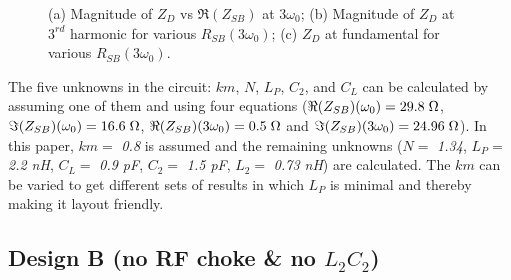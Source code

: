 \documentclass[conference]{IEEEtran}
\begin{document}
\begin{figure}[!t]
\begin{subfigure}{0.4\textwidth}
\caption{}
\label{fig:Design_A_Rn_var_1H}
\end{subfigure}
\caption{(a) Magnitude of $Z_{D}$ vs $\Re(Z_{SB})$ at $3\omega_0$; (b) Magnitude of $Z_D$ at $3^{rd}$ harmonic for various $R_{SB}(3\omega_0)$; (c) $Z_D$ at fundamental for various $R_{SB}(3\omega_0)$.}
\label{fig:Design_A_Rn_var}
\vspace{-0.2in}
\end{figure}

The five unknowns in the circuit: $km$, $N$, $L_P$, $C_2$, and $C_L$ can be calculated by assuming one of them and using four equations ($\Re(Z_{SB})(\omega_0) =  29.8\hspace{1mm} \Omega$, $\Im(Z_{SB})(\omega_0) = 16.6\hspace{1mm}\Omega$, $\Re(Z_{SB})(3\omega_0) = 0.5\hspace{1mm}\Omega$ and  $\Im(Z_{SB})(3\omega_0) = 24.96\hspace{1mm}\Omega$). In this paper, $km =$ \textit{0.8} is assumed and the remaining unknowns ($N =$ \textit{1.34}, $L_P =$ \textit{2.2 nH}, $C_L =$ \textit{0.9 pF}, $C_2 =$ \textit{1.5 pF}, $L_2 =$ \textit{0.73 nH}) are calculated. The $km$ can be varied to get different sets of results in which $L_P$ is minimal and thereby making it layout friendly.


\subsection{Design B (no RF choke \& no $L_2C_2$)}
\end{document}
